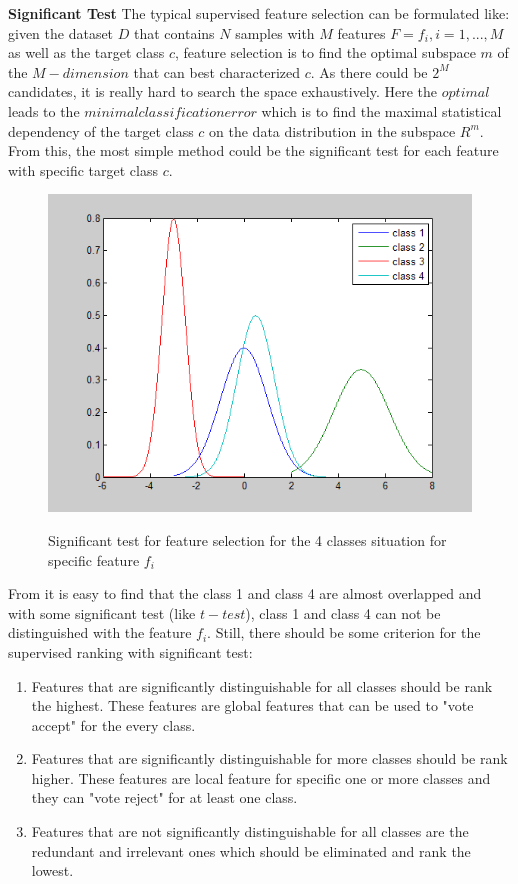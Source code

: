 \textbf{Significant Test}
The typical supervised feature selection can be formulated like: given the dataset $D$ that contains $N$ samples with $M$ features $F={f_i, i=1,...,M}$ as well as the target class $c$, feature selection is to find the optimal subspace $m$ of the $M-dimension$ that can best characterized $c$. As there could be $2^M$ candidates, it is really hard to search the space exhaustively. Here the $optimal$ leads to the $minimal classification error$ which is to find the maximal statistical dependency of the target class $c$ on the data distribution in the subspace $R^m$.  From this, the most simple method could be the significant test for each feature with specific target class $c$.
\begin{figure}[H]
  \centering
  \includegraphics[scale = .75]{fig/sign.png}\\
  \caption{Significant test for feature selection for the 4 classes situation for specific feature $f_i$}\label{fig:sign}
\end{figure}
From  it is easy to find that the class 1 and class 4 are almost overlapped and with some significant test (like $t-test$), class 1 and class 4 can not be distinguished with the feature $f_i$. Still, there should be some criterion for the supervised ranking with significant test:
\begin{enumerate}
  \item Features that are significantly distinguishable for all classes should be rank the highest. These features are global features that can be used to "vote accept" for the every class.
  \item Features that are significantly distinguishable for more classes should be rank higher. These features are local feature for specific one or more classes and they can "vote reject" for at least one class.
  \item Features that are not significantly distinguishable for all classes are the redundant and irrelevant ones which should be eliminated and rank the lowest.
\end{enumerate}

